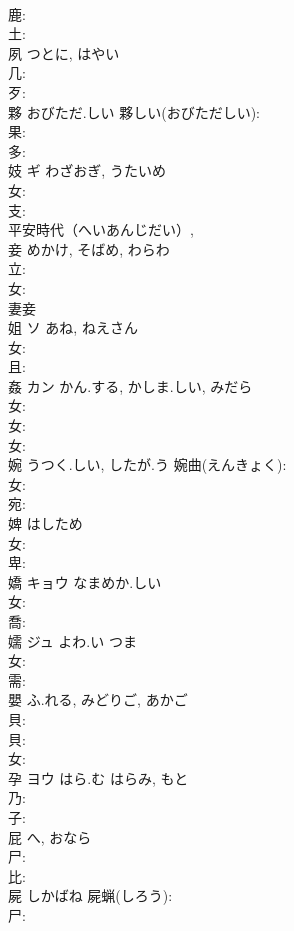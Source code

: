 \documentclass[8pt]{extreport}
\begin{document}
\begin{CJK}{UTF8}{min}
\\	鹿: 
\\	土: 
\\	夙		つとに, はやい				
\\	几: 
\\	歹: 
\\	夥		おびただ.しい			夥しい(おびただしい): 
\\	果: 
\\	多: 
\\	妓	ギ	わざおぎ, うたいめ		
\\	女: 
\\	支: 
\\	平安時代（へいあんじだい）, 
\\	妾		めかけ, そばめ, わらわ				
\\	立: 
\\	女: 
\\	妻妾 
\\	姐	ソ	あね, ねえさん		
\\	女: 
\\	且: 
\\	姦	カン	かん.する, かしま.しい, みだら		
\\	女: 
\\	女: 
\\	女: 
\\	婉		うつく.しい, したが.う			婉曲(えんきょく): 
\\	女: 
\\	宛: 
\\	婢		はしため				
\\	女: 
\\	卑: 
\\	嬌	キョウ	なまめか.しい		
\\	女: 
\\	喬: 
\\	嬬	ジュ	よわ.い	つま	
\\	女: 
\\	需: 
\\	嬰		ふ.れる, みどりご, あかご				
\\	貝: 
\\	貝: 
\\	女: 
\\	孕	ヨウ	はら.む	はらみ, もと	
\\	乃: 
\\	子: 
\\	屁		へ, おなら				
\\	尸: 
\\	比: 
\\	屍		しかばね			屍蝋(しろう): 
\\	尸: 

\end{CJK}
\end{document}
